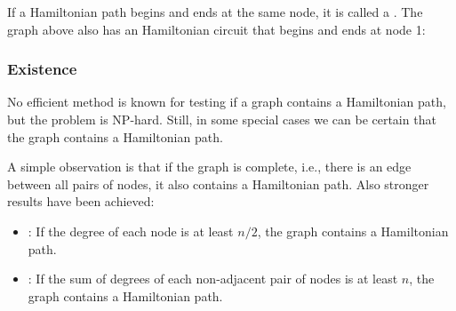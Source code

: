 If a Hamiltonian path begins and ends at the same node,
it is called a .
The graph above also has an Hamiltonian circuit
that begins and ends at node 1:
\begin{center}
\end{center}

\subsubsection{Existence}

No efficient method is known for testing if a graph
contains a Hamiltonian path, but the problem is NP-hard.
Still, in some special cases we can be certain
that the graph contains a Hamiltonian path.

A simple observation is that if the graph is complete,
i.e., there is an edge between all pairs of nodes,
it also contains a Hamiltonian path.
Also stronger results have been achieved:

\begin{itemize}
\item
{}
:
If the degree of each node is at least $n/2$,
the graph contains a Hamiltonian path.
\item
{}
:
If the sum of degrees of each non-adjacent pair of nodes
is at least $n$,
the graph contains a Hamiltonian path.
\end{itemize}

